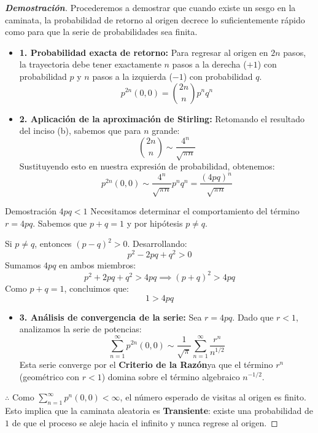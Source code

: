 \documentclass[10pt,a4paper]{article}
\begin{document}
\begin{proof}[\textbf{Demostración}]
    Procederemos a demostrar que cuando existe un sesgo en la caminata, la probabilidad de retorno al origen decrece lo suficientemente rápido como para que la serie de probabilidades sea finita.

    \begin{itemize}
        \item \textbf{1. Probabilidad exacta de retorno:}
        Para regresar al origen en $2n$ pasos, la trayectoria debe tener exactamente $n$ pasos a la derecha ($+1$) con probabilidad $p$ y $n$ pasos a la izquierda ($-1$) con probabilidad $q$.
        \[ p^{2n}(0,0) = \binom{2n}{n} p^n q^n \]

        \item \textbf{2. Aplicación de la aproximación de Stirling:}
        Retomando el resultado del inciso (b), sabemos que para $n$ grande:
        \[ \binom{2n}{n} \sim \frac{4^n}{\sqrt{\pi n}} \]
        Sustituyendo esto en nuestra expresión de probabilidad, obtenemos:
        \[ p^{2n}(0,0) \sim \frac{4^n}{\sqrt{\pi n}} p^n q^n = \frac{(4pq)^n}{\sqrt{\pi n}} \]
    \end{itemize}

    \begin{alerta}{Demostración $4pq < 1$}
        Necesitamos determinar el comportamiento del término $r = 4pq$. Sabemos que $p+q=1$ y por hipótesis $p \neq q$.
        
        Si $p \neq q$, entonces $(p-q)^2 > 0$. Desarrollando:
        \[ p^2 - 2pq + q^2 > 0 \]
        Sumamos $4pq$ en ambos miembros:
        \[ p^2 + 2pq + q^2 > 4pq \implies (p+q)^2 > 4pq \]
        Como $p+q=1$, concluimos que:
        \[ 1 > 4pq \]
    \end{alerta}

    \begin{itemize}
        \item \textbf{3. Análisis de convergencia de la serie:}
        Sea $r = 4pq$. Dado que $r < 1$, analizamos la serie de potencias:
        \[ \sum_{n=1}^{\infty} p^{2n}(0,0) \sim \frac{1}{\sqrt{\pi}} \sum_{n=1}^{\infty} \frac{r^n}{n^{1/2}} \]
        Esta serie converge por el \textbf{Criterio de la Razón}ya que el término $r^n$ (geométrico con $r < 1$) domina sobre el término algebraico $n^{-1/2}$.
    \end{itemize}

    
    $\therefore$ Como $\sum_{n=1}^{\infty} p^n(0,0) < \infty$, el número esperado de visitas al origen es finito. Esto implica que la caminata aleatoria es \textbf{Transiente}: existe una probabilidad de $1$ de que el proceso se aleje hacia el infinito y nunca regrese al origen.
    
\end{proof}
\end{document}

